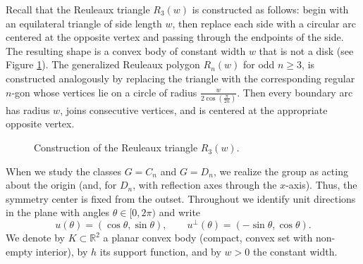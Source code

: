 \documentclass[11pt,letterpaper,reqno]{amsart}
\newcommand{\R}{\mathbb{R}}
\providecommand{\R}{\mathbb{R}}
\begin{document}
Recall that the Reuleaux triangle $R_3(w)$ is constructed as follows: begin with an equilateral triangle of side length $w$, then replace each side with a circular arc centered at the opposite vertex and passing through the endpoints of the side. The resulting shape is a convex body of constant width $w$ that is not a disk (see Figure \ref{fig:reuleaux_triangle}). The generalized Reuleaux polygon $R_n(w)$ for odd $n \geq 3$, is constructed analogously by replacing the triangle with the corresponding regular $n$-gon whose vertices lie on a circle of radius $\frac{w}{2 \cos \left( \frac{\pi}{2n}\right)}$. Then every boundary arc has radius $w$, joins consecutive vertices, and is centered at the appropriate opposite vertex.

\begin{figure}[ht]
\centering
{}
\caption{Construction of the Reuleaux triangle $R_3(w)$.}
\label{fig:reuleaux_triangle}
\end{figure}

When we study the classes $G=C_n$ and $G=D_n$, we realize the group as acting about the origin (and, for $D_n$, with reflection axes through the $x$-axis). Thus, the symmetry center is fixed from the outset. 
Throughout we identify unit directions in the plane with angles $\theta\in[0,2\pi)$ and write
\[
u(\theta)=(\cos\theta,\sin\theta),\qquad u^\perp(\theta)=(-\sin\theta,\cos\theta).
\]
We denote by $K\subset\R^2$ a planar convex body (compact, convex set with non-empty interior), by $h$ its support function, and by $w>0$ the constant width.
\end{document}
